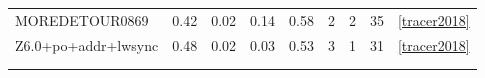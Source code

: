 {\begin{tabular}{lllllllll}
\multicolumn{1}{l|}{MOREDETOUR0869}            & \multicolumn{1}{l|}{0.42}       & \multicolumn{1}{l|}{0.02} & \multicolumn{1}{l|}{0.14}      & \multicolumn{1}{l|}{0.58}  & \multicolumn{1}{l|}{2}                                                                          & \multicolumn{1}{l|}{2}                                                                           & \multicolumn{1}{l|}{35}                                                                                    & \ref{tracer2018}   \\
\multicolumn{1}{l|}{Z6.0+po+addr+lwsync}       & \multicolumn{1}{l|}{0.48}       & \multicolumn{1}{l|}{0.02} & \multicolumn{1}{l|}{0.03}      & \multicolumn{1}{l|}{0.53}  & \multicolumn{1}{l|}{3}                                                                          & \multicolumn{1}{l|}{1}                                                                           & \multicolumn{1}{l|}{31}                                                                                    & \ref{tracer2018}   \\
                                                  &                                 &                           &                                &                            &                                                                                                 &                                                                                                  &                                                                                                            &                                     \\
                                                  &                                 &                           &                                &                            &                                                                                                 &                                                                                                  &                                                                                                            &                                    
\end{tabular}%
}